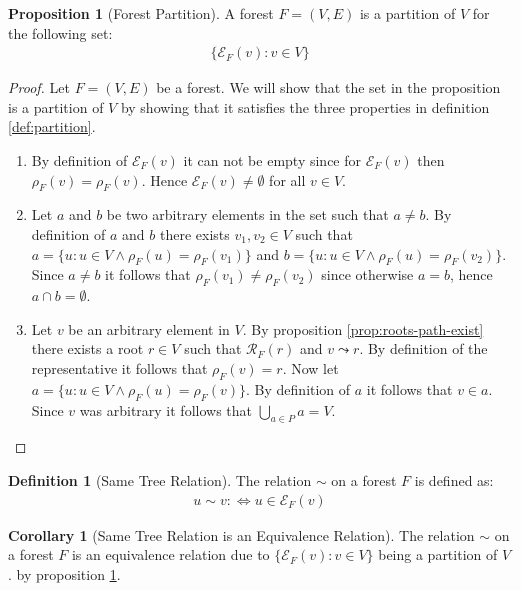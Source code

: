 \documentclass[a4paper,12pt]{article}
\theoremstyle{definition}
\newtheorem{definition}{Definition}[section]
\newtheorem{proposition}{Proposition}[section]
\newtheorem{corollary}{Corollary}[section]
\begin{document}
\begin{proposition}[Forest Partition]\label{prop:forest-partition}
    A forest $F = (V, E)$ is a partition of $V$ for the following set:
    \begin{align*}
        \{\mathcal{E}_F(v) : v \in V\}
    \end{align*}
\end{proposition}

\begin{proof}
    Let $F = (V, E)$ be a forest. We will show that the set in the proposition
    is a partition of $V$ by showing that it satisfies the three properties in
    definition \ref{def:partition}.
    \begin{enumerate}
        \item By definition of $\mathcal{E}_F(v)$ it can not be empty since for
        $\mathcal{E}_F(v)$ then $\rho_F(v) = \rho_F(v)$. Hence $\mathcal{E}_F(v)
        \neq \emptyset$ for all $v \in V$.
        \item Let $a$ and $b$ be two arbitrary elements in the set such that $a
        \neq b$. By definition of $a$ and $b$ there exists $v_1, v_2 \in V$ such
        that $a = \{u : u \in V \land \rho_F(u) = \rho_F(v_1)\}$ and $b = \{u :
        u \in V \land \rho_F(u) = \rho_F(v_2)\}$. Since $a \neq b$ it follows
        that $\rho_F(v_1) \neq \rho_F(v_2)$ since otherwise $a = b$, hence $a
        \cap b = \emptyset$.
        \item Let $v$ be an arbitrary element in $V$. By proposition
        \ref{prop:roots-path-exist} there exists a root $r \in V$ such that
        $\mathcal{R}_F(r)$ and $v \leadsto r$. By definition of the
        representative it follows that $\rho_F(v) = r$. Now let $a = \{u : u \in
        V \land \rho_F(u) = \rho_F(v)\}$. By definition of $a$ it follows that
        $v \in a$. Since $v$ was arbitrary it follows that $\bigcup_{a \in P} a
        = V$.
    \end{enumerate}
\end{proof}

\begin{definition}[Same Tree Relation]
    The relation $\sim$ on a forest $F$ is defined as:
    \begin{align*}
        u \sim v :\iff u \in \mathcal{E}_F(v)
    \end{align*}
\end{definition}

\begin{corollary}[Same Tree Relation is an Equivalence Relation]
    The relation $\sim$ on a forest $F$ is an equivalence relation due to
    $\{\mathcal{E}_F(v) : v \in V\}$ being a partition of $V$. by proposition
    \ref{prop:forest-partition}.
\end{corollary}
\end{document}
